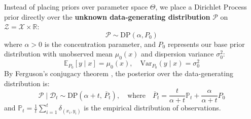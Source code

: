 \documentclass{article}
\begin{document}
Instead of placing priors over parameter space $\Theta$, we place a Dirichlet Process prior directly over the \textbf{unknown data-generating distribution} $\mathcal{P}$ on $\mathcal{Z} = \mathcal{X} \times \mathbb{R}$:
\begin{equation}
\label{eq:dp_prior}
\mathcal{P} \sim \mathrm{DP}(\alpha, P_0)
\end{equation}
where $\alpha > 0$ is the concentration parameter, and $P_0$ represents our base prior distribution with unobserved mean $\mu_0(x)$ and dispersion variance $\sigma_0^2$:
\begin{equation}
\mathbb{E}_{P_0}[y \mid x] = \mu_0(x), \quad \mathrm{Var}_{P_0}(y \mid x) = \sigma_0^2
\end{equation}
By Ferguson's conjugacy theorem \citep{ferguson1973bayesian}, the posterior over the data-generating distribution is:
\begin{equation}
\label{eq:dp_posterior}
\mathcal{P} \mid \mathcal{D}_t \sim \mathrm{DP}\left(\alpha + t, \, \overline{P}_t\right), \quad \text{where} \quad \overline{P}_t = \frac{t}{\alpha + t} \mathbb{P}_t + \frac{\alpha}{\alpha + t} P_0
\end{equation}
and $\mathbb{P}_t = \frac{1}{t}\sum_{i=1}^t \delta_{(x_i, y_i)}$ is the empirical distribution of observations.
\end{document}
